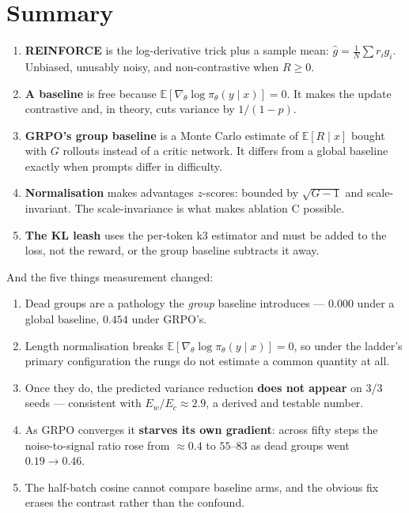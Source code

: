\documentclass[11pt,letterpaper]{article}
\theoremstyle{definition}
\newcommand{\E}{\mathbb{E}}
\newcommand{\pol}{\pi_\theta}
\newcommand{\grad}{\nabla_\theta}
\newcommand{\score}{\grad \log \pol(y \mid x)}
\newcommand{\scorei}{g_i}
\begin{document}
\section{Summary}
\label{sec:summary}

\begin{enumerate}
  \item \textbf{REINFORCE} is the log-derivative trick plus a sample mean: $\hat{g} = \frac{1}{N}\sum
        r_i \scorei$. Unbiased, unusably noisy, and non-contrastive when $R \ge 0$.
  \item \textbf{A baseline} is free because $\E[\score] = 0$. It makes the update contrastive and, in
        theory, cuts variance by $1/(1-p)$.
  \item \textbf{GRPO's group baseline} is a Monte Carlo estimate of $\E[R \mid x]$ bought with $G$
        rollouts instead of a critic network. It differs from a global baseline exactly when prompts
        differ in difficulty.
  \item \textbf{Normalisation} makes advantages $z$-scores: bounded by $\sqrt{G-1}$ and
        scale-invariant. The scale-invariance is what makes ablation C possible.
  \item \textbf{The KL leash} uses the per-token k3 estimator and must be added to the loss, not the
        reward, or the group baseline subtracts it away.
\end{enumerate}

And the five things measurement changed:

\begin{enumerate}
  \item Dead groups are a pathology the \emph{group} baseline introduces --- $0.000$ under a global
        baseline, $0.454$ under GRPO's.
  \item Length normalisation breaks $\E[\score] = 0$, so under the ladder's primary configuration the
        rungs do not estimate a common quantity at all.
  \item Once they do, the predicted variance reduction \textbf{does not appear} on 3/3 seeds ---
        consistent with $E_w/E_c \approx 2.9$, a derived and testable number.
  \item As GRPO converges it \textbf{starves its own gradient}: across fifty steps the noise-to-signal
        ratio rose from $\approx 0.4$ to $55$--$83$ as dead groups went $0.19 \to 0.46$.
  \item The half-batch cosine cannot compare baseline arms, and the obvious fix erases the contrast
        rather than the confound.
\end{enumerate}
\end{document}
